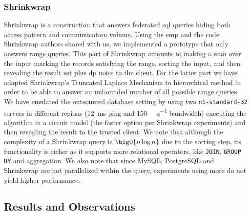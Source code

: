 		\subsubsection*{Shrinkwrap}

			Shrinkwrap \cite{shrinkwrap} is a construction that answers federated \acrshort{sql} queries hiding both access pattern and communication volume.
			Using the \acrshort{emp} \cite{emp-toolkit} and the code Shrinkwrap authors shared with us, we implemented a prototype that only answers range queries.
			This part of Shrinkwrap amounts to making a scan over the input marking the records satisfying the range, sorting the input, and then revealing the result set plus \acrshort{dp} noise to the client.
			For the latter part we have adapted Shrinkwrap's Truncated Laplace Mechanism \cite[Definition 4]{shrinkwrap} to hierarchical method \cite{hierarchical-methods-for-dp} in order to be able to answer an unbounded number of all possible range queries.
			We have emulated the outsourced database setting by using two \texttt{n1-standard-32} servers in different regions (\SI{12}{\milli\second} ping and \SI{150}{\mega\byte\per\second} bandwidth) executing the algorithm in a circuit model (the faster option per Shrinkwrap experiments) and then revealing the result to the trusted client.
			We note that although the complexity of a Shrinkwrap query is $\bigO{n \log n}$ due to the sorting step, its functionality is richer as it supports more relational operators, like \texttt{JOIN}, \texttt{GROUP BY} and aggregation.
			We also note that since MySQL, PostgreSQL and Shrinkwrap are not parallelized within the query, experiments using more  do not yield higher performance.

	\subsection{Results and Observations}\label{section:range-persistent:experiments:results}

